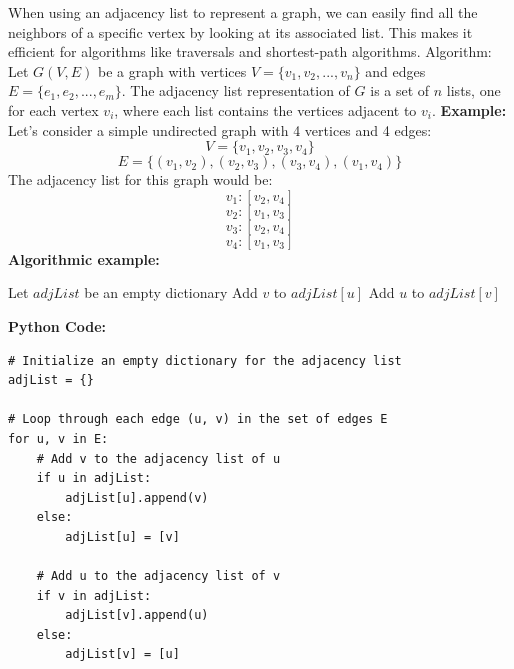 \documentclass[12pt]{book} %
\begin{document}
When using an adjacency list to represent a graph, we can easily find all the neighbors of a specific vertex by looking at its associated list. This makes it efficient for algorithms like traversals and shortest-path algorithms.
\FloatBarrier
Algorithm:
\FloatBarrier
Let \( G(V, E) \) be a graph with vertices \( V = \{v_1, v_2, ..., v_n\} \) and edges \( E = \{e_1, e_2, ..., e_m\} \). The adjacency list representation of \( G \) is a set of \( n \) lists, one for each vertex \( v_i \), where each list contains the vertices adjacent to \( v_i \).
\FloatBarrier
\textbf{Example:}
\FloatBarrier
Let's consider a simple undirected graph with 4 vertices and 4 edges:
\FloatBarrier
\[ V = \{v_1, v_2, v_3, v_4\} \]
\[ E = \{(v_1, v_2), (v_2, v_3), (v_3, v_4), (v_1, v_4)\} \]
\FloatBarrier
The adjacency list for this graph would be:
\FloatBarrier
\[ v_1: [v_2, v_4] \]
\[ v_2: [v_1, v_3] \]
\[ v_3: [v_2, v_4] \]
\[ v_4: [v_1, v_3] \]
\FloatBarrier
\textbf{Algorithmic example:}
\begin{algorithm}
\caption{Create Adjacency List of a Graph}
\begin{algorithmic}
\State Let $adjList$ be an empty dictionary
    \State Add $v$ to $adjList[u]$
    \State Add $u$ to $adjList[v]$
\EndFor
\end{algorithmic}
\end{algorithm}
\FloatBarrier
\textbf{Python Code:}
\FloatBarrier
\begin{verbatim}
# Initialize an empty dictionary for the adjacency list
adjList = {}

# Loop through each edge (u, v) in the set of edges E
for u, v in E:
    # Add v to the adjacency list of u
    if u in adjList:
        adjList[u].append(v)
    else:
        adjList[u] = [v]
    
    # Add u to the adjacency list of v
    if v in adjList:
        adjList[v].append(u)
    else:
        adjList[v] = [u]
\end{verbatim}
\FloatBarrier
\end{document}
